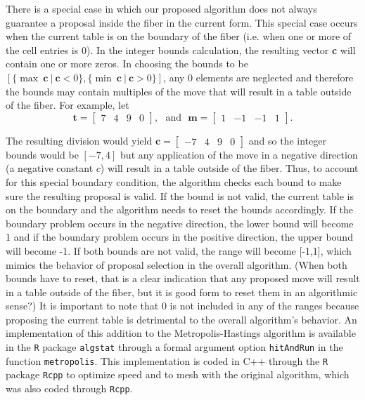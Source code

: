 \documentclass{phd}\usepackage[]{graphicx}\usepackage[]{color}
\begin{document}
There is a special case in which our proposed algorithm does not always guarantee a proposal inside the fiber in the current form. This special case occurs when the current table is on the boundary of the fiber (i.e. when one or more of the cell entries is 0). In the integer bounds calculation, the resulting vector \textbf{c} will contain one or more zeros. In choosing the bounds to be $[\{ \max ~\textbf{c} ~|~ \textbf{c} < 0\} , \{ \min ~\textbf{c} ~|~ \textbf{c} > 0\}]$, any 0 elements are neglected and therefore the bounds may contain multiples of the move that will result in a table outside of the fiber. For example, let 
$$\textbf{t} = \begin{bmatrix}
7 & 4 & 9 & 0
\end{bmatrix}, ~~~\text{and}~~~ \textbf{m} = \begin{bmatrix}1 & -1 & -1 & 1 \end{bmatrix}.$$

The resulting division would yield $\textbf{c} = \begin{bmatrix} -7 & 4 & 9 & 0 \end{bmatrix}$ and so the integer bounds would be $[-7, 4]$ but any application of the move in a negative direction (a negative constant $c$) will result in a table outside of the fiber. Thus, to account for this special boundary condition, the algorithm checks each bound to make sure the resulting proposal is valid. If the bound is not valid, the current table is on the boundary and the algorithm needs to reset the bounds accordingly. If the boundary problem occurs in the negative direction, the lower bound will become 1 and if the boundary problem occurs in the positive direction, the upper bound will become -1. If both bounds are not valid, the range will become [-1,1], which mimics the behavior of proposal selection in the overall algorithm. (When both bounds have to reset, that is a clear indication that any proposed move will result in a table outside of the fiber, but it is good form to reset them in an algorithmic sense?) It is important to note that 0 is not included in any of the ranges because proposing the current table is detrimental to the overall algorithm's behavior. An implementation of this addition to the Metropolis-Hastings algorithm is available in the \verb|R| package \verb|algstat| through a formal argument option \verb|hitAndRun| in the function \verb|metropolis|. This implementation is coded in C++ through the \verb|R| package \verb|Rcpp| to optimize speed and to mesh with the original algorithm, which was also coded through \verb|Rcpp|. 
\end{document}
